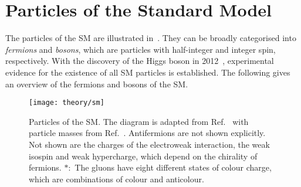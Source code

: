 \section{Particles of the Standard Model}%
\label{sec:sm_overview}

The particles of the SM are illustrated in~. They can be
broadly categorised into \emph{fermions} and \emph{bosons}, which are particles
with half-integer and integer spin, respectively. With the discovery of the
Higgs boson in 2012~\cite{HIGG-2012-27,CMS-HIG-12-028}, experimental evidence
for the existence of all SM particles is established. The following gives an
overview of the fermions and bosons of the SM.


\begin{figure}[htbp]
  \centering

  \texttt{[image: theory/sm]}

  \caption[Particles of the SM]{Particles of the SM. The diagram is adapted from
    Ref.~\cite{sm_tikz} with particle masses from
    Ref.~\cite{pdg2020}. Antifermions are not shown explicitly.  Not shown are
    the charges of the electroweak interaction, the weak isospin and weak
    hypercharge, which depend on the chirality of fermions. $*$:~The gluons have
    eight different states of colour charge, which are combinations of colour
    and anticolour.}%
  \label{fig:sm_particles}
\end{figure}

